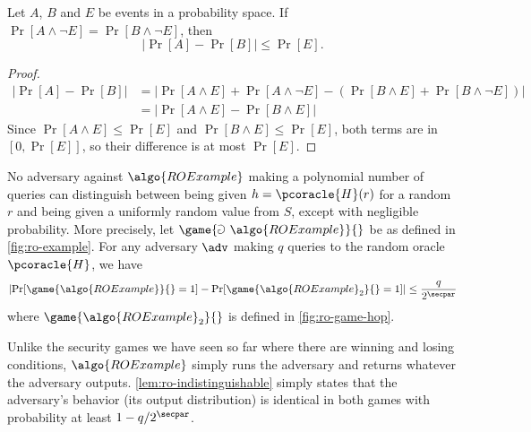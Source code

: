 \begin{lemma}\label{lem:difference}
  Let $A$, $B$ and $E$ be events in a probability space. If $\Pr[A \wedge \neg E] = \Pr[B \wedge \neg E]$, then
  \[
  |\Pr[A] - \Pr[B]| \leq \Pr[E].
  \]
\end{lemma}

\begin{proof}
  \begin{align*}
    |\Pr[A] - \Pr[B]| &= |\Pr[A \wedge E] + \Pr[A \wedge \neg E] - (\Pr[B \wedge E] + \Pr[B \wedge \neg E])| \\
    &= |\Pr[A \wedge E] - \Pr[B \wedge E]|
  \end{align*}
  Since $\Pr[A \wedge E] \leq \Pr[E]$ and $\Pr[B \wedge E] \leq \Pr[E]$, both terms are in $[0, \Pr[E]]$, so their difference is at most $\Pr[E]$.
\end{proof}


\begin{lemma}\label{lem:ro-indistinguishable}
  No adversary against $\algo{ROExample}$ making a polynomial number of queries can distinguish between being given $h = \pcoracle{H}(r)$ for a random $r$ and being given a uniformly random value from $S$, except with negligible probability.
  More precisely, let $\game{\Game~\algo{ROExample}}{}$ be as defined in \autoref{fig:ro-example}.
  For any adversary $\adv$ making $q$ queries to the random oracle $\pcoracle{H}$, we have
  \[
  \left|\Pr[\game{\algo{ROExample}}{} = 1] - \Pr[\game{\algo{ROExample}_2}{} = 1]\right| \leq \frac{q}{2^\secpar}
  \]
  where $\game{\algo{ROExample}_2}{}$ is defined in \autoref{fig:ro-game-hop}.
\end{lemma}

\begin{remark}
  Unlike the security games we have seen so far where there are winning and losing conditions, $\algo{ROExample}$ simply runs the adversary and returns whatever the adversary outputs.
  \autoref{lem:ro-indistinguishable} simply states that the adversary's behavior (its output distribution) is identical in both games with probability at least $1 - q/2^\secpar$.
\end{remark}

